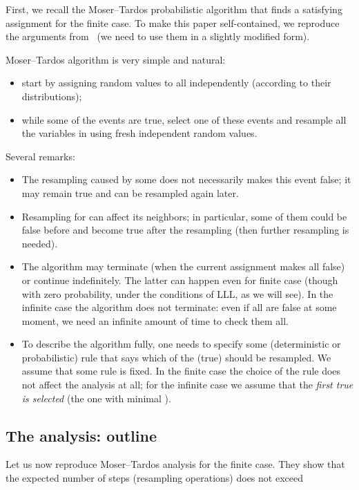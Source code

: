 \documentclass[12pt]{article}
\begin{document}
First, we recall the Moser--Tardos probabilistic algorithm that finds a satisfying assignment for the finite case. To make this paper self-contained, we reproduce the arguments from~\cite{moser-tardos} (we need to use them in a slightly modified form).

\medskip\noindent
Moser--Tardos algorithm is very simple and natural:

\begin{itemize}
\item start by assigning random values to all  independently (according to their distributions);
\item while some of the events  are true, select one of these events and resample all the variables in  using fresh independent random values.
\end{itemize}

\noindent
Several remarks:

\begin{itemize}

\item The resampling caused by some  does not necessarily makes this event false; it may remain true and can be resampled again later.

\item Resampling for  can affect its neighbors; in particular, some of them could be false before and become true after the resampling (then further resampling is needed).

\item The algorithm may terminate (when the current assignment makes all  false) or continue indefinitely. The latter can happen even for finite case (though with zero probability, under the conditions of LLL, as we will see). In the infinite case the algorithm does not terminate: even if all  are false at some moment, we need an infinite amount of time to check them all.

\item To describe the algorithm fully, one needs to specify some (deterministic or probabilistic) rule that says which of the (true)  should be resampled. We assume that some rule is fixed. In the finite case the choice of the rule does not affect the analysis at all; for the infinite case we assume that the \emph{first true  is selected} (the one with minimal ).

\end{itemize}

\subsection{The analysis: outline}
Let us now reproduce Moser--Tardos analysis for the finite case. They show that the expected number of steps (resampling operations) does not exceed
   
\end{document}

